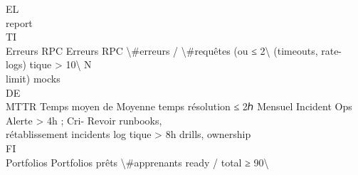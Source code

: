 \vspace{0.5em}
\vspace{0.5em}
\vspace{0.5em}
\vspace{0.5em}
EL\\
report\\
\vspace{0.5em}
\vspace{0.5em}
\vspace{0.5em}
\vspace{0.5em}
TI\\
Erreurs RPC  Erreurs RPC          \textbackslash{}#erreurs / \textbackslash{}#requêtes (ou   ≤ 2\textbackslash{}%
(timeouts, rate-     logs)                                                                 tique \textgreater{} 10\textbackslash{}%
\vspace{0.5em}
\vspace{0.5em}
\vspace{0.5em}
\vspace{0.5em}
N\\
limit)                                                                                                               mocks\\
\vspace{0.5em}
\vspace{0.5em}
\vspace{0.5em}
\vspace{0.5em}
DE\\
MTTR         Temps moyen de       Moyenne temps résolution ≤ 2ℎ   Mensuel          Incident Ops         Alerte \textgreater{} 4h ; Cri-        Revoir runbooks,\\
rétablissement       incidents                                        log                  tique \textgreater{} 8h                drills, ownership\\
\vspace{0.5em}
\vspace{0.5em}
\vspace{0.5em}
\vspace{0.5em}
FI\\
Portfolios   Portfolios prêts     \textbackslash{}#apprenants ready / total ≥ 90\textbackslash{}%
